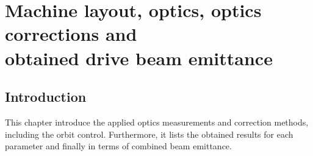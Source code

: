 \chapter{Machine layout, optics, optics corrections and \\
         obtained drive beam emittance}
       
\section{Introduction}

This chapter introduce the applied optics measurements and 
correction methods, including the orbit control. 
Furthermore, it lists the obtained results for 
each parameter and finally in terms of combined beam emittance.







